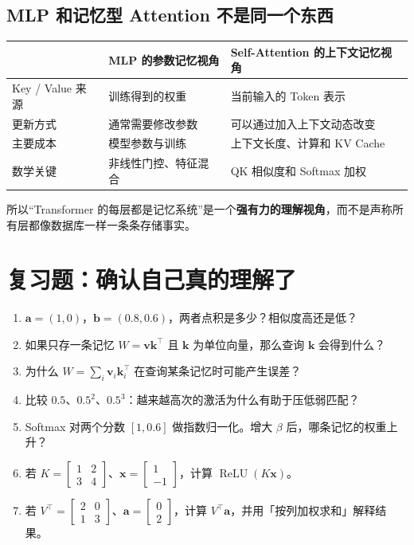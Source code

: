 \documentclass[11pt,a4paper,UTF8]{ctexart}
\numberwithin{equation}{section}
\newcommand{\vect}[1]{\boldsymbol{#1}}
\newcommand{\relu}{\operatorname{ReLU}}
\begin{document}
\subsection{MLP 和记忆型 Attention 不是同一个东西}
\begin{table}[H]
\centering\small
\renewcommand{\arraystretch}{1.4}
\begin{tabularx}{\linewidth}{@{}p{28mm}XX@{}}
\toprule
 & MLP 的参数记忆视角 & Self-Attention 的上下文记忆视角 \\
\midrule
Key / Value 来源 & 训练得到的权重 & 当前输入的 Token 表示 \\
更新方式 & 通常需要修改参数 & 可以通过加入上下文动态改变 \\
主要成本 & 模型参数与训练 & 上下文长度、计算和 KV Cache \\
数学关键 & 非线性门控、特征混合 & QK 相似度和 Softmax 加权 \\
\bottomrule
\end{tabularx}
\end{table}

所以“Transformer 的每层都是记忆系统”是一个\textbf{强有力的理解视角}，而不是声称所有层都像数据库一样一条条存储事实。

\section{复习题：确认自己真的理解了}

\begin{enumerate}[label=\textbf{题 \arabic*.}]
\item $\vect{a}=(1,0)$，$\vect{b}=(0.8,0.6)$，两者点积是多少？相似度高还是低？
\item 如果只存一条记忆 $W=\vect{v}\vect{k}^\top$ 且 $\vect{k}$ 为单位向量，那么查询 $\vect{k}$ 会得到什么？
\item 为什么 $W=\sum_i\vect{v}_i\vect{k}_i^\top$ 在查询某条记忆时可能产生误差？
\item 比较 $0.5$、$0.5^2$、$0.5^3$：越来越高次的激活为什么有助于压低弱匹配？
\item Softmax 对两个分数 $[1,0.6]$ 做指数归一化。增大 $\beta$ 后，哪条记忆的权重上升？
\item 若 $K=\begin{bmatrix}1&2\\3&4\end{bmatrix}$、$\vect{x}=\begin{bmatrix}1\\-1\end{bmatrix}$，计算 $\relu(K\vect{x})$。
\item 若 $V^\top=\begin{bmatrix}2&0\\1&3\end{bmatrix}$、$\vect{a}=\begin{bmatrix}0\\2\end{bmatrix}$，计算 $V^\top\vect{a}$，并用「按列加权求和」解释结果。
\end{enumerate}
\end{document}
